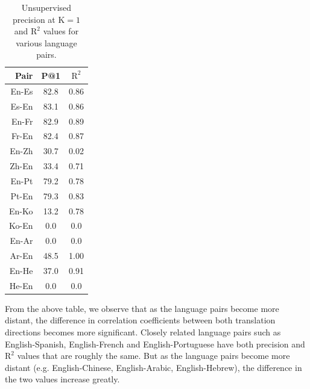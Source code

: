 \documentclass{article}
\begin{document}
\begin{table}[h]
  \centering
  \begin{tabular}{r|c c}
    \toprule
    Pair & P@1 & $\text{R}^2$ \\
    \midrule
    En-Es & 82.8 & 0.86 \\
    Es-En & 83.1 & 0.86 \\
    \midrule
    En-Fr & 82.9 & 0.89 \\
    Fr-En & 82.4 & 0.87 \\
    \midrule
    En-Zh & 30.7 & 0.02 \\
    Zh-En & 33.4 & 0.71 \\
    \midrule
    En-Pt & 79.2 & 0.78 \\
    Pt-En & 79.3 & 0.83 \\
    \midrule
    En-Ko & 13.2 & 0.78 \\
    Ko-En &  0.0 &  0.0 \\
    \midrule
    En-Ar &  0.0 &  0.0 \\
    Ar-En & 48.5 & 1.00 \\
    \midrule
    En-He & 37.0 & 0.91 \\
    He-En &  0.0 &  0.0 \\
    \bottomrule
  \end{tabular}
  \caption{Unsupervised precision at $\text{K}=1$ and $\text{R}^2$ values for various language pairs.}
\end{table}

From the above table, we observe that as the language pairs become more distant, the
difference in correlation coefficients between both translation directions becomes
more significant. Closely related language pairs such as English-Spanish, English-French
and English-Portuguese have both precision and $\text{R}^2$ values that are roughly
the same. But as the language pairs become more distant (e.g. English-Chinese,
English-Arabic, English-Hebrew), the difference in the two values increase greatly.
\end{document}
